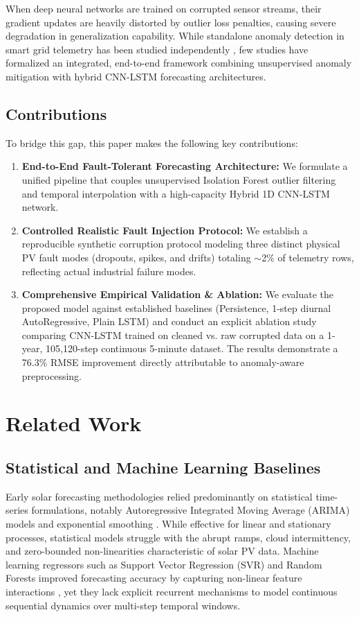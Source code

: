 \documentclass[conference]{IEEEtran}
\begin{document}
When deep neural networks are trained on corrupted sensor streams, their gradient updates are heavily distorted by outlier loss penalties, causing severe degradation in generalization capability. While standalone anomaly detection in smart grid telemetry has been studied independently \cite{zhang2021survey}, few studies have formalized an integrated, end-to-end framework combining unsupervised anomaly mitigation with hybrid CNN-LSTM forecasting architectures.

\subsection*{Contributions}
To bridge this gap, this paper makes the following key contributions:
\begin{enumerate}
    \item \textbf{End-to-End Fault-Tolerant Forecasting Architecture:} We formulate a unified pipeline that couples unsupervised Isolation Forest outlier filtering and temporal interpolation with a high-capacity Hybrid 1D CNN-LSTM network.
    \item \textbf{Controlled Realistic Fault Injection Protocol:} We establish a reproducible synthetic corruption protocol modeling three distinct physical PV fault modes (dropouts, spikes, and drifts) totaling $\sim$2\% of telemetry rows, reflecting actual industrial failure modes.
    \item \textbf{Comprehensive Empirical Validation \& Ablation:} We evaluate the proposed model against established baselines (Persistence, 1-step diurnal AutoRegressive, Plain LSTM) and conduct an explicit ablation study comparing CNN-LSTM trained on cleaned vs. raw corrupted data on a 1-year, 105{,}120-step continuous 5-minute dataset. The results demonstrate a 76.3\% RMSE improvement directly attributable to anomaly-aware preprocessing.
\end{enumerate}

\section{Related Work}

\subsection{Statistical and Machine Learning Baselines}
Early solar forecasting methodologies relied predominantly on statistical time-series formulations, notably Autoregressive Integrated Moving Average (ARIMA) models and exponential smoothing \cite{sobri2018review, zhang2015baseline}. While effective for linear and stationary processes, statistical models struggle with the abrupt ramps, cloud intermittency, and zero-bounded non-linearities characteristic of solar PV data. Machine learning regressors such as Support Vector Regression (SVR) and Random Forests improved forecasting accuracy by capturing non-linear feature interactions \cite{abumohsen2024hybrid}, yet they lack explicit recurrent mechanisms to model continuous sequential dynamics over multi-step temporal windows.
\end{document}
